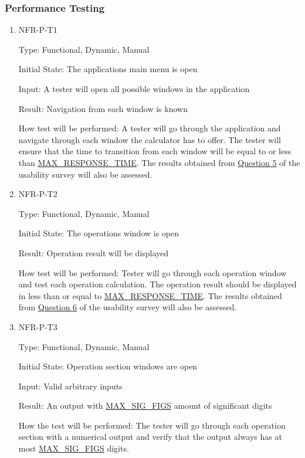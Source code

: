 \documentclass[12pt, titlepage]{article}
\begin{document}
\subsubsection{Performance Testing}
\begin{enumerate}

\item{NFR-P-T1\\}

Type: Functional, Dynamic, Manual 
					
Initial State: The applications main menu is open
					
Input: A tester will open all possible windows in the application
					
Result: Navigation from each window is known
					
How test will be performed: A tester will go through the application and navigate through each window the calculator has to offer. The tester will ensure that the time to transition from each window will be equal to or less than \hyperref[sec:sp]{MAX\_RESPONSE\_TIME}. The results obtained from \hyperref[sec:survey]{Question 5} of the usability survey will also be assessed.

\item{NFR-P-T2\\}

Type: Functional, Dynamic, Manual
					
Initial State: The operations window is open
					
Result: Operation result will be displayed
					
How test will be performed: Tester will go through each operation window and test each operation calculation. The operation result should be displayed in less than or equal to \hyperref[sec:sp]{MAX\_RESPONSE\_TIME}. The results obtained from \hyperref[sec:survey]{Question 6} of the usability survey will also be assessed.


\item{NFR-P-T3\\}

Type: Functional, Dynamic, Manual
					
Initial State: Operation section windows are open
					
Input: Valid arbitrary inputs
					
Result: An output with \hyperref[sec:sp]{MAX\_SIG\_FIGS} amount of significant digits

How the test will be performed: The tester will go through each operation section with a numerical output and verify that the output always has at most \hyperref[sec:sp]{MAX\_SIG\_FIGS} digits. 

\end{enumerate}
\end{document}
